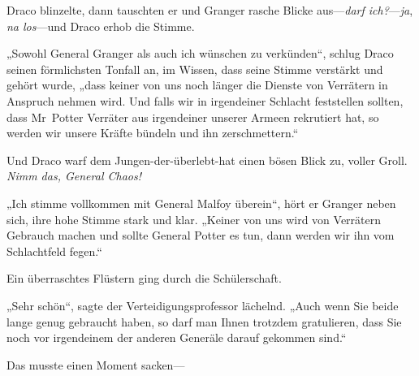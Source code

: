 Draco blinzelte, dann tauschten er und Granger rasche Blicke aus—\emph{darf ich?}—\emph{ja}, \emph{na los}—und Draco erhob die Stimme.

„Sowohl General Granger als auch ich wünschen zu verkünden“, schlug Draco seinen förmlichsten Tonfall an, im Wissen, dass seine Stimme verstärkt und gehört wurde, „dass keiner von uns noch länger die Dienste von Verrätern in Anspruch nehmen wird. Und falls wir in irgendeiner Schlacht feststellen sollten, dass Mr~Potter Verräter aus irgendeiner unserer Armeen rekrutiert hat, so werden wir unsere Kräfte bündeln und ihn zerschmettern.“

Und Draco warf dem Jungen-der-überlebt-hat einen bösen Blick zu, voller Groll. \emph{Nimm das, General Chaos!}

„Ich stimme vollkommen mit General Malfoy überein“, hört er Granger neben sich, ihre hohe Stimme stark und klar. „Keiner von uns wird von Verrätern Gebrauch machen und sollte General Potter es tun, dann werden wir ihn vom Schlachtfeld fegen.“

Ein überraschtes Flüstern ging durch die Schülerschaft.

„Sehr schön“, sagte der Verteidigungsprofessor lächelnd. „Auch wenn Sie beide lange genug gebraucht haben, so darf man Ihnen trotzdem gratulieren, dass Sie noch vor irgendeinem der anderen Generäle darauf gekommen sind.“

Das musste einen Moment sacken—

